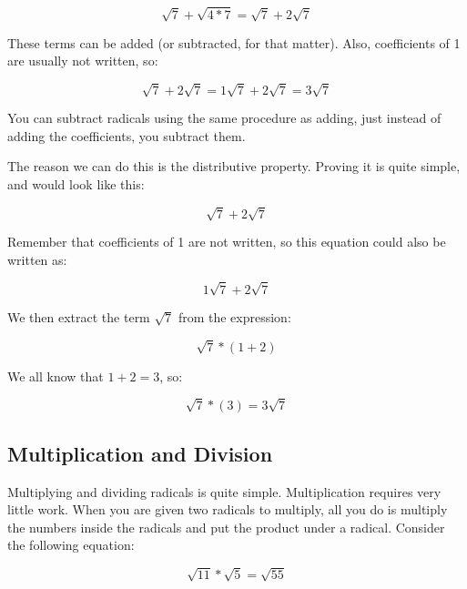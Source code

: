 $${\sqrt{7}+\sqrt{4*7}}={\sqrt{7}+2\sqrt{7}}$$



These terms can be added (or subtracted, for that matter). Also, coefficients of 1 are
usually not written, so:



$${\sqrt{7}+2\sqrt{7}}={1\sqrt{7}+2\sqrt{7}}={3\sqrt{7}}$$



You can subtract radicals using the same procedure as adding, just instead of adding the
coefficients, you subtract them.



The reason we can do this is the distributive property. Proving it is quite simple, and
would look like this:



$${\sqrt{7}+2\sqrt{7}}$$



Remember that coefficients of 1 are not written, so this equation could also be written as:



$${1\sqrt{7}+2\sqrt{7}}$$



We then extract the term ${\sqrt{7}}$ from the expression:



$${\sqrt{7}*(1+2)}$$



We all know that ${1+2}={3}$, so:



$${\sqrt{7}*(3)}={3\sqrt{7}}$$




\subsection{Multiplication and Division}
\label{sss:mult-c79b}




Multiplying and dividing radicals is quite simple. Multiplication requires very little
work. When you are given two radicals to multiply, all you do is multiply the numbers
inside the radicals and put the product under a radical. Consider the following equation:



$${\sqrt{11}*\sqrt{5}}={\sqrt{55}}$$



